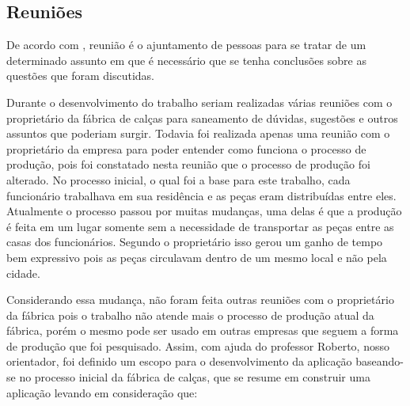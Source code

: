 \subsection{Reuniões}
\par De acordo com , reunião é o ajuntamento de
pessoas para se tratar de um determinado assunto em que é necessário que se
tenha conclusões sobre as questões que foram discutidas.

\par Durante o desenvolvimento do trabalho seriam realizadas várias reuniões
com o proprietário da fábrica de calças para saneamento de dúvidas, sugestões e
outros assuntos que poderiam surgir. Todavia foi realizada apenas uma reunião com o proprietário
da empresa para poder entender como funciona o processo de produção, pois foi constatado nesta reunião que o
processo de produção foi alterado. No processo inicial, o qual foi a base para este trabalho, cada funcionário trabalhava em
sua residência e as peças eram distribuídas entre eles. Atualmente o processo
passou por muitas mudanças, uma delas é que a produção é feita em um lugar
somente sem a necessidade de transportar as peças entre as casas dos
funcionários. Segundo o proprietário isso gerou um ganho de tempo bem expressivo
pois as peças circulavam dentro de um mesmo local e não pela cidade. 

\par Considerando essa mudança, não foram feita outras reuniões com o proprietário da fábrica
pois o trabalho não atende mais o processo de produção atual da fábrica, porém o
mesmo pode ser usado em outras empresas que seguem a forma de produção que foi
pesquisado. Assim, com ajuda do professor Roberto, nosso orientador, foi definido 
um escopo para o desenvolvimento da aplicação baseando-se no processo inicial da
fábrica de calças, que se resume em construir uma aplicação levando em consideração que:

